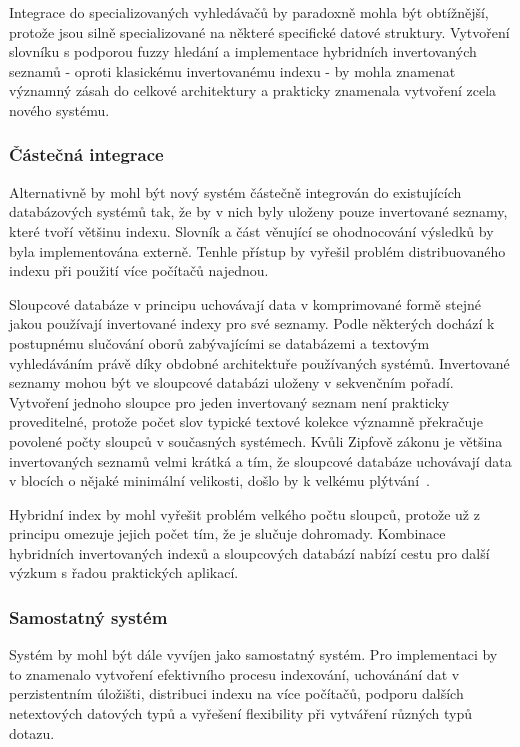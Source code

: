 \documentclass[11pt,letterpaper,oneside,openright]{book}
\begin{document}
Integrace do specializovaných vyhledávačů by paradoxně mohla být obtížnější,
protože jsou silně specializované na některé specifické datové struktury.
Vytvoření slovníku s podporou fuzzy hledání a implementace hybridních
invertovaných seznamů - oproti klasickému invertovanému indexu - by mohla
znamenat významný zásah do celkové architektury a prakticky znamenala vytvoření
zcela nového systému.

\subsubsection{Částečná integrace}
Alternativně by mohl být nový systém částečně integrován do existujících
databázových systémů tak, že by v nich byly uloženy pouze invertované seznamy,
které tvoří většinu indexu. Slovník a část věnující se ohodnocování výsledků by
byla implementována externě. Tenhle přístup by vyřešil problém distribuovaného
indexu při použití více počítačů najednou.

Sloupcové databáze v principu uchovávají data v komprimované formě stejné jakou
používají invertované indexy pro své seznamy. Podle některých dochází k
postupnému slučování oborů zabývajícími se databázemi a textovým vyhledáváním
právě díky obdobné architektuře používaných systémů. Invertované seznamy mohou
být ve sloupcové databázi uloženy v sekvenčním pořadí. Vytvoření jednoho
sloupce pro jeden invertovaný seznam není prakticky proveditelné, protože počet
slov typické textové kolekce významně překračuje povolené počty sloupců v
současných systémech. Kvůli Zipfově zákonu je většina invertovaných seznamů
velmi krátká a tím, že sloupcové databáze uchovávají data v blocích o nějaké
minimální velikosti, došlo by k velkému plýtvání~\cite{Bjorklund_aconfluence}.

Hybridní index by mohl vyřešit problém velkého počtu sloupců, protože už z
principu omezuje jejich počet tím, že je slučuje dohromady. Kombinace
hybridních invertovaných indexů a sloupcových databází nabízí cestu pro další
výzkum s řadou praktických aplikací.

\subsubsection{Samostatný systém}
Systém by mohl být dále vyvíjen jako samostatný systém. Pro implementaci by to
znamenalo vytvoření efektivního procesu indexování, uchovánání dat v
perzistentním úložišti, distribuci indexu na více počítačů, podporu dalších
netextových datových typů a vyřešení flexibility při vytváření různých typů
dotazu.
\end{document}
